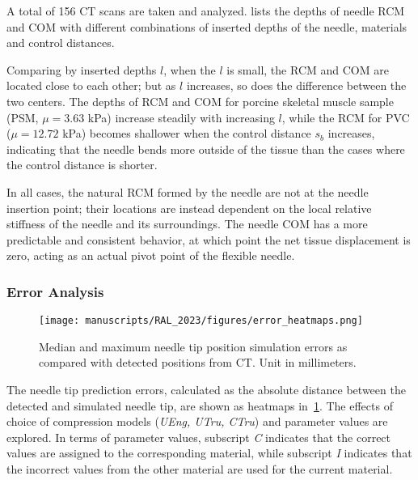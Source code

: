 A total of 156 CT scans are taken and analyzed.  lists the depths of needle RCM and COM with different combinations of inserted depths of the needle, materials and control distances. 

Comparing by inserted depths $l$, when the $l$ is small, the RCM and COM are located close to each other; but as $l$ increases, so does the difference between the two centers. The depths of RCM and COM for porcine skeletal muscle sample (PSM, $\mu = 3.63$ kPa) increase steadily with increasing $l$, while the RCM for PVC ($\mu = 12.72$ kPa) becomes shallower when the control distance $s_b$ increases, indicating that the needle bends more outside of the tissue than the cases where the control distance is shorter.

In all cases, the natural RCM formed by the needle are not at the needle insertion point; their locations are instead dependent on the local relative stiffness of the needle and its surroundings. The needle COM has a more predictable and consistent behavior, at which point the net tissue displacement is zero, acting as an actual pivot point of the flexible needle.

\subsubsection{Error Analysis}
\label{sec:chap-3-error-analysis}

 \begin{figure}[t]
   \centering
   \texttt{[image: manuscripts/RAL\_2023/figures/error\_heatmaps.png]}
   \caption{Median and maximum needle tip position simulation errors as compared with detected positions from CT. Unit in millimeters.}
   \label{fig:chap-3-error-heatmaps}
\end{figure}


The needle tip prediction errors, calculated as the absolute distance between the detected and simulated needle tip, are shown as heatmaps in~\cref{fig:chap-3-error-heatmaps}. The effects of choice of compression models (\textit{UEng, UTru, CTru}) and parameter values are explored. In terms of parameter values, subscript \textit{C} indicates that the correct values are assigned to the corresponding material, while subscript \textit{I} indicates that the incorrect values from the other material are used for the current material.

